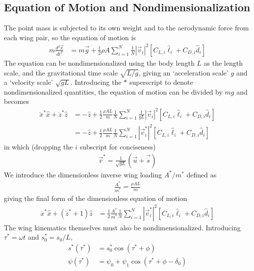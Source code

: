 \documentclass[11pt,letterpaper]{article}
\begin{document}
\subsection{Equation of Motion and Nondimensionalization}

The point mass is subjected to its own weight
and to the aerodynamic force from each wing pair, so the equation of motion is
\begin{align}
    m \frac{d^2 \vec{x}}{d t^2} &= m \vec{g} + \frac12 \rho A \sum_{i=1}^N \frac1N |\vec{v}_i|^2 \left[ C_{L,i} \hat{\ell}_i + C_{D,i} \hat{d}_i \right]
\end{align}
The equation can be nondimensionalized using
the body length $L$ as the length scale, and the
gravitational time scale $\sqrt{L/g}$,
giving an `acceleration scale' $g$ and
a `velocity scale' $\sqrt{gL}$.
Introducing the $*$ superscript to denote nondimensionalized
quantities, the equation of motion can be divided by $mg$
and becomes
\begin{align}
    \ddot{x}^* \hat{x} + \ddot{z}^* \hat{z} &= -\hat{z} + \frac12 \frac{\rho A L}{m} \frac1N \sum_{i=1}^N \frac{1}{gL} |\vec{v}_i|^2 \left[ C_{L,i} \hat{\ell}_i + C_{D,i} \hat{d}_i \right] \nonumber \\
                                            &= -\hat{z} + \frac12 \frac{\rho A L}{m} \frac1N \sum_{i=1}^N |\vec{v}_i^*|^2 \left[ C_{L,i} \hat{\ell}_i + C_{D,i} \hat{d}_i \right]
\end{align}
in which (dropping the $i$ subscript for conciseness)
\begin{align}
    \vec{v}^* = \frac{1}{\sqrt{gL}} \left( \vec{u} + \vec{\dot{s}} \right)
\end{align}
We introduce the dimensionless inverse wing loading $A^*/m^*$
defined as
\begin{align}
    \frac{A^*}{m^*} = \frac{\rho A L}{m} 
\end{align}
giving the final form of the dimensionless equation of motion
\begin{align}
    \ddot{x}^* \hat{x} + (\ddot{z}^* + 1) \hat{z} &= \frac12 \frac{A^*}{m^*} \frac1N \sum_{i=1}^N |\vec{v}_i^*|^2 \left[ C_{L,i} \hat{\ell}_i + C_{D,i} \hat{d}_i \right]
\end{align}
The wing kinematics themselves must also be nondimensionalized.
Introducing $\tau^* = \omega t$ and $s_0^* = s_0 / L$,
\begin{align}
    s^*(\tau^*) &= s_0^* \cos(\tau^* + \phi) \\
    \psi(\tau^*) &= \psi_0 + \psi_1 \cos(\tau^* + \phi - \delta_0)
\end{align}
\end{document}
